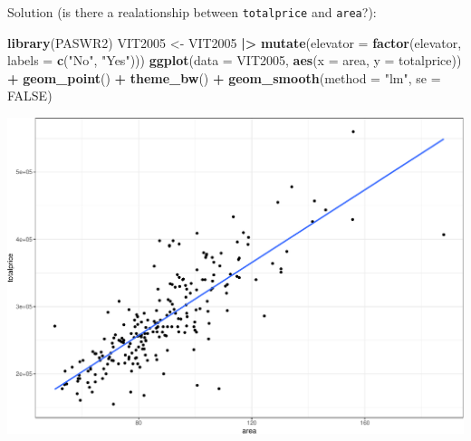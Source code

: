 \documentclass[
  ignorenonframetext,
]{beamer}
\newenvironment{Shaded}{\begin{snugshade}}{\end{snugshade}}
\newcommand{\AttributeTok}[1]{\textcolor[rgb]{0.13,0.29,0.53}{#1}}
\newcommand{\ConstantTok}[1]{\textcolor[rgb]{0.56,0.35,0.01}{#1}}
\newcommand{\FunctionTok}[1]{\textcolor[rgb]{0.13,0.29,0.53}{\textbf{#1}}}
\newcommand{\NormalTok}[1]{#1}
\newcommand{\OtherTok}[1]{\textcolor[rgb]{0.56,0.35,0.01}{#1}}
\newcommand{\SpecialCharTok}[1]{\textcolor[rgb]{0.81,0.36,0.00}{\textbf{#1}}}
\newcommand{\StringTok}[1]{\textcolor[rgb]{0.31,0.60,0.02}{#1}}
\begin{document}
\begin{frame}[fragile]{Solution (is there a realationship between
\texttt{totalprice} and \texttt{area}?):}
\protect\hypertarget{solution-is-there-a-realationship-between-totalprice-and-area}{}
\normalsize

\begin{Shaded}
\begin{Highlighting}[]
\FunctionTok{library}\NormalTok{(PASWR2)}
\NormalTok{VIT2005 }\OtherTok{\textless{}{-}}\NormalTok{ VIT2005 }\SpecialCharTok{|\textgreater{}} 
  \FunctionTok{mutate}\NormalTok{(}\AttributeTok{elevator =} \FunctionTok{factor}\NormalTok{(elevator, }\AttributeTok{labels =} \FunctionTok{c}\NormalTok{(}\StringTok{"No"}\NormalTok{, }\StringTok{"Yes"}\NormalTok{)))}
\FunctionTok{ggplot}\NormalTok{(}\AttributeTok{data =}\NormalTok{ VIT2005, }\FunctionTok{aes}\NormalTok{(}\AttributeTok{x =}\NormalTok{ area, }\AttributeTok{y =}\NormalTok{ totalprice)) }\SpecialCharTok{+} 
  \FunctionTok{geom\_point}\NormalTok{() }\SpecialCharTok{+} 
  \FunctionTok{theme\_bw}\NormalTok{() }\SpecialCharTok{+}
  \FunctionTok{geom\_smooth}\NormalTok{(}\AttributeTok{method =} \StringTok{"lm"}\NormalTok{, }\AttributeTok{se =} \ConstantTok{FALSE}\NormalTok{)}
\end{Highlighting}
\end{Shaded}

\begin{center}\includegraphics[width=0.7\linewidth,height=0.4\textheight]{Week5_Lect_files/figure-beamer/unnamed-chunk-29-1} \end{center}
\normalsize
\end{frame}
\end{document}
